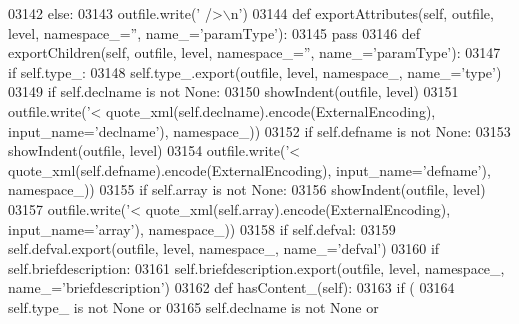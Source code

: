 \begin{DoxyCode}
{{{{{{{{{{{{{{{{{{{{{{{{{{{{{{{{{{{{{{{{{{{{{{{{{{{{{{{{{{{{{{{{{{{{{{{{{{{{{{{{{{{{{{{{{{{{{{{{{{{{{{{{{{{{{{{{{{{{{{{{{{{{{{{{{{{{{{{{{{{{{{{{{{{{{{{{{{{{{{{{{{{{{{{{{{{{{{{{{{{{{{{{{{{{{{{{{{{{{{{{{{{{{{{03142         \textcolor{keywordflow}{else}:
03143             outfile.write(\textcolor{stringliteral}{' />\(\backslash\)n'})
03144     \textcolor{keyword}{def }exportAttributes(self, outfile, level, namespace\_='', name\_='paramType'):
03145         \textcolor{keywordflow}{pass}
03146     \textcolor{keyword}{def }exportChildren(self, outfile, level, namespace\_='', name\_='paramType'):
03147         \textcolor{keywordflow}{if} self.type\_:
03148             self.type\_.export(outfile, level, namespace\_, name\_=\textcolor{stringliteral}{'type'})
03149         \textcolor{keywordflow}{if} self.declname \textcolor{keywordflow}{is} \textcolor{keywordflow}{not} \textcolor{keywordtype}{None}:
03150             showIndent(outfile, level)
03151             outfile.write(\textcolor{stringliteral}{'<%
      quote_xml(self.declname).encode(ExternalEncoding), input\_name=\textcolor{stringliteral}{'declname'}), namespace\_))
03152         \textcolor{keywordflow}{if} self.defname \textcolor{keywordflow}{is} \textcolor{keywordflow}{not} \textcolor{keywordtype}{None}:
03153             showIndent(outfile, level)
03154             outfile.write(\textcolor{stringliteral}{'<%
      quote_xml(self.defname).encode(ExternalEncoding), input\_name=\textcolor{stringliteral}{'defname'}), namespace\_))
03155         \textcolor{keywordflow}{if} self.array \textcolor{keywordflow}{is} \textcolor{keywordflow}{not} \textcolor{keywordtype}{None}:
03156             showIndent(outfile, level)
03157             outfile.write(\textcolor{stringliteral}{'<%
      quote_xml(self.array).encode(ExternalEncoding), input\_name=\textcolor{stringliteral}{'array'}), namespace\_))
03158         \textcolor{keywordflow}{if} self.defval:
03159             self.defval.export(outfile, level, namespace\_, name\_=\textcolor{stringliteral}{'defval'})
03160         \textcolor{keywordflow}{if} self.briefdescription:
03161             self.briefdescription.export(outfile, level, namespace\_, name\_=\textcolor{stringliteral}{'briefdescription'})
03162     \textcolor{keyword}{def }hasContent_(self):
03163         \textcolor{keywordflow}{if} (
03164             self.type_ \textcolor{keywordflow}{is} \textcolor{keywordflow}{not} \textcolor{keywordtype}{None} \textcolor{keywordflow}{or}
03165             self.declname \textcolor{keywordflow}{is} \textcolor{keywordflow}{not} \textcolor{keywordtype}{None} \textcolor{keywordflow}{or}
}}}}}}}}}}}}}}}}}}}}}}}}}}}}}}}}}}}}}}}}}}}}}}}}}}}}}}}}}}}}}}}}}}}}}}}}}}}}}}}}}}}}}}}}}}}}}}}}}}}}}}}}}}}}}}}}}}}}}}}}}}}}}}}}}}}}}}}}}}}}}}}}}}}}}}}}}}}}}}}}}}}}}}}}}}}}}}}}}}}}}}}}}}}}}}}}}}}}}}}}}}}}}}}}}}
\end{DoxyCode}
